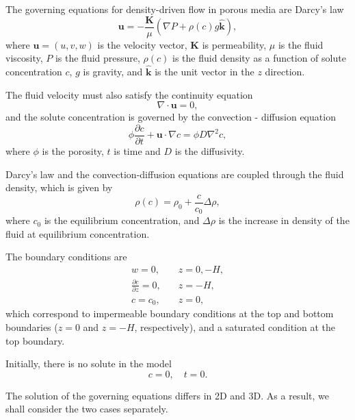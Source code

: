 \documentclass[11pt, a4paper]{csiroreport2012}
\begin{document}
The governing equations for density-driven flow in porous media are Darcy's law
\begin{equation}
\mathbf{u} = - \frac{\mathbf{K}}{\mu} \left(\nabla P + \rho(c) g \hat{\mathbf{k}} \right),
\label{eq:darcy}
\end{equation}
where $\mathbf{u} = (u, v, w)$ is the velocity vector, $\mathbf{K}$ is permeability, $\mu$ is the fluid viscosity, $P$ is the fluid pressure, $\rho(c)$ is the fluid density as a function of solute concentration $c$, $g$ is gravity, and $\hat{\mathbf{k}}$ is the unit vector in the $z$ direction.

The fluid velocity must also satisfy the continuity equation
\begin{equation}
\nabla \cdot \mathbf{u} = 0,
\end{equation}
and the solute concentration is governed by the convection - diffusion equation
\begin{equation}
\phi \frac{\partial c}{\partial t} + \mathbf{u} \cdot \nabla c = \phi D \nabla^2 c,
\label{eq:convdiff}
\end{equation}
where $\phi$ is the porosity, $t$ is time and $D$ is the diffusivity. 

Darcy's law and the convection-diffusion equations are coupled through the fluid density, which is given by
\begin{equation}
\rho(c) = \rho_0 + \frac{c}{c_0} \Delta \rho,
\label{eq:density}
\end{equation}
where $c_0$ is the equilibrium concentration, and $\Delta \rho$ is the increase in density of the fluid at equilibrium concentration.

The boundary conditions are
\begin{align}
w = 0,&  \quad z = 0, -H, \\
\frac{\partial c}{\partial z} = 0,& \quad z = -H, \\
c = c_0,& \quad z = 0,
\end{align}
which correspond to impermeable boundary conditions at the top and bottom boundaries ($z = 0$ and $z=-H$, respectively), and a saturated condition at the top boundary.

Initially, there is no solute in the model
\begin{equation}
c = 0, \quad t = 0.
\end{equation}

The solution of the governing equations differs in 2D and 3D. As a result, we shall consider the two cases separately. 
\end{document}

